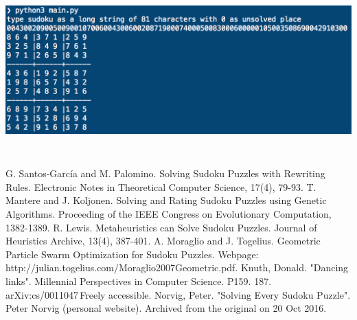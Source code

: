 \documentclass[12pt]{article}
\begin{document}
\begin{spacing}{1.1}
\vspace{2.5ex}
\noindent
\includegraphics[height=6.5cm]{example}

\begin{thebibliography}{}
	 G. Santos-García and M. Palomino. Solving Sudoku Puzzles with Rewriting Rules. Electronic Notes in Theoretical Computer Science, 17(4), 79-93.
	T. Mantere and J. Koljonen. Solving and Rating Sudoku Puzzles using Genetic Algorithms. Proceeding of the IEEE Congress on Evolutionary Computation, 1382-1389.
	R. Lewis. Metaheuristics can Solve Sudoku Puzzles. Journal of Heuristics Archive, 13(4), 387-401.
	A. Moraglio and J. Togelius. Geometric Particle Swarm Optimization for Sudoku Puzzles. Webpage: http://julian.togelius.com/Moraglio2007Geometric.pdf.
	Knuth, Donald. "Dancing links". Millennial Perspectives in Computer Science. P159. 187. arXiv:cs/0011047 Freely accessible.
	Norvig, Peter. "Solving Every Sudoku Puzzle". Peter Norvig (personal website). Archived from the original on 20 Oct 2016.
\end{thebibliography}

\end{spacing}
\end{document}

